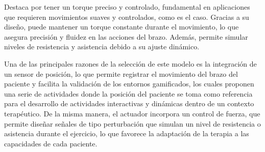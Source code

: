 Destaca por tener un torque preciso y controlado, fundamental en aplicaciones que requieren movimientos suaves y controlados, como es el caso.
Gracias a su diseño, puede mantener un torque constante durante el movimiento, lo que asegura precisión y fluidez en las acciones del brazo.
Además, permite simular niveles de resistencia y asistencia debido a su ajuste dinámico.

Una de las principales razones de la selección de este modelo es la integración de un sensor de posición, lo que permite registrar el movimiento del brazo del paciente y facilita la validación de los entornos gamificados, los cuales proponen una serie de actividades donde la posición del paciente se toma como referencia para el desarrollo de actividades interactivas y dinámicas dentro de un contexto terapéutico.
De la misma manera, el actuador incorpora un control de fuerza, que permite diseñar señales de tipo perturbación que simulan un nivel de resistencia o asistencia durante el ejercicio, lo que favorece la adaptación de la terapia a las capacidades de cada paciente.
